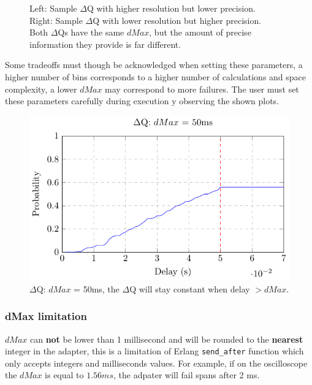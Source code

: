 \begin{figure}[H]
\begin{subfigure}{.5\textwidth}
                \label{fig:hist_100}%
            \end{subfigure}%
            \label{fig:hist_dmax}%
            \caption{Left: Sample $\Delta$Q with higher resolution but lower precision. \\
            Right: Sample $\Delta$Q with lower resolution but higher precision. \\
            Both $\Delta$Qs have the same $dMax$, but the amount of precise information they provide is far different.}
        \end{figure}%

Some tradeoffs must though be acknowledged when setting these parameters, a higher number of bins corresponds to a higher number of calculations and space complexity, a lower $dMax$ may correspond to more failures. The user must set these parameters carefully during execution y observing the shown plots.

    \begin{figure}[H]
        \begin{center}
            \includegraphics[scale = 1]{tikz/cdf_dmax.pdf}
        \end{center}
        \caption{$\Delta$Q: $dMax$ = 50ms, the $\Delta$Q will stay constant when delay $> dMax$.}
    \end{figure}

    \subsubsection{dMax limitation}
        $dMax$ can \textbf{not} be lower than 1 millisecond and will be rounded to the \textbf{nearest} integer in the adapter, this is a limitation of Erlang \texttt{send\_after} function which only accepts integers and milliseconds values. For example, if on the oscilloscope the $dMax$ is equal to $1.56 ms$, the adpater will fail spans after 2 ms.

